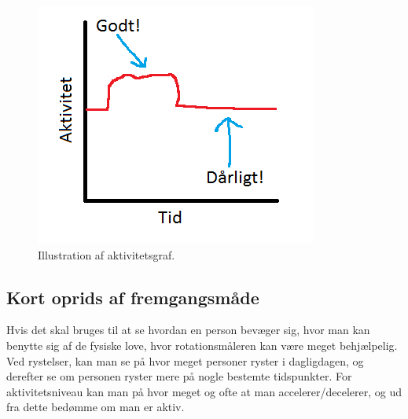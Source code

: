 \begin{figure}
	\centering
	\includegraphics{graphics/aktivitet_billed}
	\caption{Illustration af aktivitetsgraf.}\label{aktivitetsgraf}
\end{figure}


\subsection{Kort oprids af fremgangsmåde} 
Hvis det skal bruges til at se hvordan en person bevæger sig, hvor man kan benytte sig af de fysiske love, hvor rotationsmåleren kan være meget behjælpelig. Ved rystelser, kan man se på hvor meget personer ryster i dagligdagen, og derefter se om personen ryster mere på nogle bestemte tidspunkter. For aktivitetsniveau kan man på hvor meget og ofte at man accelerer/decelerer, og ud fra dette bedømme om man er aktiv.
